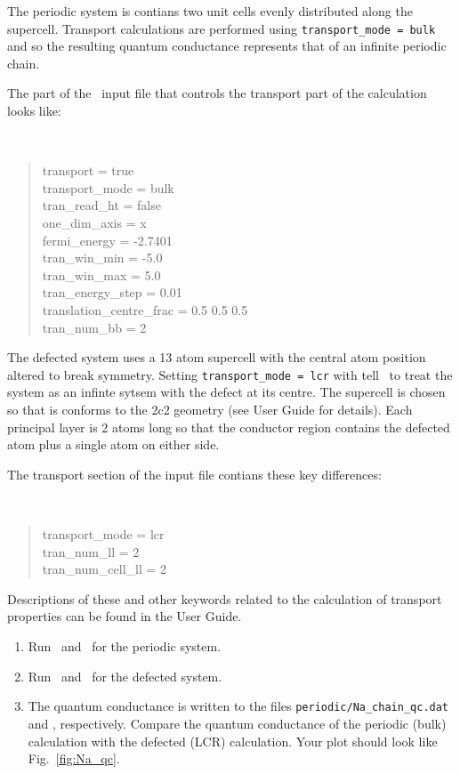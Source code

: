 \documentclass[a4paper,11pt,twoside]{article}
\begin{document}
The periodic system is contians two unit cells evenly distributed along the 
supercell. Transport calculations are performed using {\tt transport\_mode =
bulk} and so the resulting quantum conductance represents that of an infinite
periodic chain. 

The part of the \wannier\ input file that controls the transport part
of the calculation looks like:

{\tt
\begin{quote}
transport = true\\
transport\_mode = bulk\\
tran\_read\_ht = false\\
one\_dim\_axis = x\\
fermi\_energy = -2.7401\\
tran\_win\_min = -5.0\\
tran\_win\_max = 5.0\\
tran\_energy\_step = 0.01\\
translation\_centre\_frac = 0.5 0.5 0.5\\
tran\_num\_bb = 2

\end{quote} }

The defected system uses a 13 atom supercell with the central atom
position altered to break symmetry. Setting {\tt transport\_mode = lcr} with tell 
\wannier\ to treat the system as an infinte sytsem with the defect at its centre.
The supercell is chosen so that is conforms to the 2c2 geometry (see User Guide 
for details). Each principal layer is 2 atoms long so that the conductor 
region contains the defected atom plus a single atom on either side.

The transport section of the input file contians  these key differences:

{\tt
\begin{quote}
transport\_mode = lcr\\
tran\_num\_ll = 2\\
tran\_num\_cell\_ll = 2\\

\end{quote} }

Descriptions of these and other keywords related to the calculation of
transport properties can be found in the User Guide.

\begin{enumerate}
\item Run \pwscf\ and \wannier\ for the periodic system.
\item Run \pwscf\ and \wannier\ for the defected system.
\item The quantum conductance is written to the files {\tt periodic/Na\_chain\_qc.dat} 
and , respectively. 
Compare the quantum conductance of the periodic (bulk) calculation with the
defected (LCR) calculation. Your plot should look like Fig.~\ref{fig:Na_qc}.
\end{enumerate}
\end{document}
